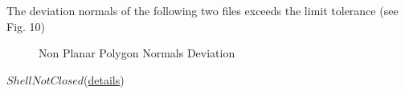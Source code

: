 \documentclass[12pt]{article}
\begin{document}
The deviation normals of the following two files exceeds the limit tolerance (see Fig. 10)
\begin{figure}[htbp]
\centering
{}
\caption{Non Planar Polygon Normals Deviation}
\end{figure}

$Shell Not Closed$(\href{https://val3dity.readthedocs.io/en/latest/errors/#shell-not-closed}{details})
\end{document}
